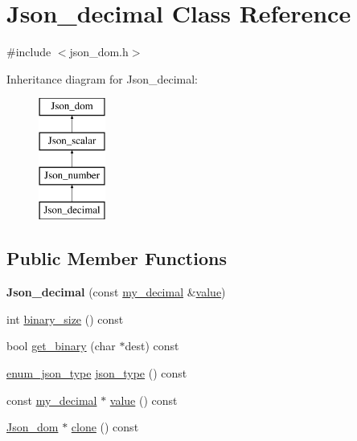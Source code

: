 \hypertarget{classJson__decimal}{}\section{Json\+\_\+decimal Class Reference}
\label{classJson__decimal}


{\ttfamily \#include $<$json\+\_\+dom.\+h$>$}

Inheritance diagram for Json\+\_\+decimal\+:\begin{figure}[H]
\begin{center}
\leavevmode
\includegraphics[height=4.000000cm]{classJson__decimal}
\end{center}
\end{figure}
\subsection*{Public Member Functions}
\begin{DoxyCompactItemize}
\item 
\mbox{\label{classJson__decimal_a0bd560296509187158bf0ca9b01d9579}} 
{\bfseries Json\+\_\+decimal} (const \mbox{\hyperlink{classmy__decimal}{my\+\_\+decimal}} \&\mbox{\hyperlink{classJson__decimal_ab5a0c36eb896377174cb30939b8802e4}{value}})
\item 
int \mbox{\hyperlink{classJson__decimal_ae65238ee764087fe5b03a9bf86131ea1}{binary\+\_\+size}} () const
\item 
bool \mbox{\hyperlink{classJson__decimal_a34fbae9992bfb9665b47a0c14dc1528b}{get\+\_\+binary}} (char $\ast$dest) const
\item 
\mbox{\hyperlink{classJson__dom_af37eed7dfe1da1d6507d3ab85320eb03}{enum\+\_\+json\+\_\+type}} \mbox{\hyperlink{classJson__decimal_a95b359e78ebb8d88e4bd8ef10a06b116}{json\+\_\+type}} () const
\item 
const \mbox{\hyperlink{classmy__decimal}{my\+\_\+decimal}} $\ast$ \mbox{\hyperlink{classJson__decimal_ab5a0c36eb896377174cb30939b8802e4}{value}} () const
\item 
\mbox{\hyperlink{classJson__dom}{Json\+\_\+dom}} $\ast$ \mbox{\hyperlink{classJson__decimal_a73afc8bc022cc9d7a31e4404613933ff}{clone}} () const
\end{DoxyCompactItemize}
